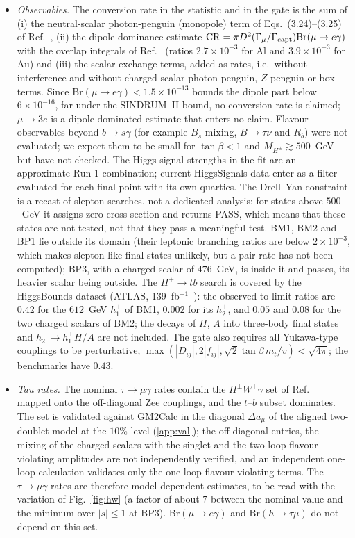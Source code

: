 \documentclass[twocolumn,epjc3]{svjour3}
\newcommand{\HG}{Ref.~\cite{HerreroGarcia:2017xdq}}
\newcommand{\Br}{\mathrm{Br}}
\begin{document}
\begin{itemize}
\item \emph{Observables.} The conversion rate in the statistic and in the gate is the sum of (i) the neutral-scalar photon-penguin (monopole) term of Eqs.~(3.24)--(3.25) of \HG{}, (ii) the dipole-dominance estimate $\mathrm{CR}=\pi D^2(\Gamma_\mu/\Gamma_{\rm capt})\Br(\mu\to e\gamma)$ with the overlap integrals of Ref.~\cite{Kitano:2002mt} (ratios $2.7\times10^{-3}$ for Al and $3.9\times10^{-3}$ for Au) and (iii) the scalar-exchange terms, added as rates, i.e.\ without interference and without charged-scalar photon-penguin, $Z$-penguin or box terms. Since $\Br(\mu\to e\gamma)<1.5\times10^{-13}$ bounds the dipole part below $6\times10^{-16}$, far under the SINDRUM~II bound, no conversion rate is claimed; $\mu\to3e$ is a dipole-dominated estimate that enters no claim. Flavour observables beyond $b\to s\gamma$ (for example $B_s$ mixing, $B\to\tau\nu$ and $R_b$) were not evaluated; we expect them to be small for $\tan\beta<1$ and $M_{H^\pm}\gtrsim500$~GeV but have not checked. The Higgs signal strengths in the fit are an approximate Run-1 combination; current HiggsSignals data enter as a filter evaluated for each final point with its own quartics. The Drell--Yan constraint is a recast of slepton searches, not a dedicated analysis: for states above $500$~GeV it assigns zero cross section and returns PASS, which means that these states are not tested, not that they pass a meaningful test. BM1, BM2 and BP1 lie outside its domain (their leptonic branching ratios are below $2\times10^{-3}$, which makes slepton-like final states unlikely, but a pair rate has not been computed); BP3, with a charged scalar of $476$~GeV, is inside it and passes, its heavier scalar being outside. The $H^\pm\to tb$ search is covered by the HiggsBounds dataset (ATLAS, 139~fb$^{-1}$~\cite{ATLAS:2021upq}): the observed-to-limit ratios are $0.42$ for the $612$~GeV $h_1^+$ of BM1, $0.002$ for its $h_2^+$, and $0.05$ and $0.08$ for the two charged scalars of BM2; the decays of $H$, $A$ into three-body final states and $h_2^+\to h_1^+H/A$ are not included. The gate also requires all Yukawa-type couplings to be perturbative, $\max(|D_{ij}|,2|f_{ij}|,\sqrt2\tan\beta\,m_t/v)<\sqrt{4\pi}$; the benchmarks have $0.43$.
\item \emph{Tau rates.} The nominal $\tau\to\mu\gamma$ rates contain the $H^\pm W^\mp\gamma$ set of Ref.~\cite{Ilisie:2015tra} mapped onto the off-diagonal Zee couplings, and the $t$--$b$ subset dominates. The set is validated against GM2Calc in the diagonal $\Delta a_\mu$ of the aligned two-doublet model at the $10\%$ level (\ref{app:val}); the off-diagonal entries, the mixing of the charged scalars with the singlet and the two-loop flavour-violating amplitudes are not independently verified, and an independent one-loop calculation validates only the one-loop flavour-violating terms. The $\tau\to\mu\gamma$ rates are therefore model-dependent estimates, to be read with the variation of Fig.~\ref{fig:hw} (a factor of about $7$ between the nominal value and the minimum over $|s|\le1$ at BP3). $\Br(\mu\to e\gamma)$ and $\Br(h\to\tau\mu)$ do not depend on this set.

\end{itemize}
\end{document}
